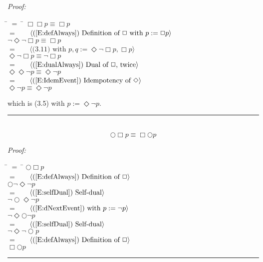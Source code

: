 \documentclass[fleqn, leqno]{article}
\newcommand{\lgap}{2pt}                             %
\newcommand{\mymathindent}{24pt}                      %
\newcommand{\next}{\bigcirc}
\newcommand{\event}{\Diamond}
\newcommand{\always}{\Box}
\newcommand{\myqed}{\hfill\rule[-.23ex]{1.2ex}{2.0ex}}
\newcommand{\Gll} {\langle}                         %
\newcommand{\Ggg} {\rangle}                         %
\newcommand{\Hint}[1]     {\ \ \ $\Gll              \mbox{#1} \Ggg$ }   %
\begin{document}
\emph{Proof:}
\begin{tabbing}
\hspace{\mymathindent} \= $= \;$ \= \kill
  \> \>   $\always\always p \equiv \always p$\\[\lgap]
  \> $=$  \>  \Hint{(\ref{E:defAlways}) Definition of $\always$ with $p := \always p$}\\[\lgap]
  \> \>   $\lnot\event\lnot\always p \equiv \always p$\\[\lgap]
  \> $=$  \>  \Hint{(3.11) with $p,q := \event\lnot\always p, \always p$}\\[\lgap]
  \> \>   $\event\lnot\always p \equiv \lnot\always p$\\[\lgap]
  \> $=$  \>  \Hint{(\ref{E:dualAlways}) Dual of $\always$, twice}\\[\lgap]
  \> \>   $\event\event\lnot p \equiv \event\lnot p$\\[\lgap]
  \> $=$  \>  \Hint{(\ref{E:IdemEvent}) Idempotency of $\event$}\\[\lgap]
  \> \>   $\event\lnot p \equiv \event\lnot p$\\[\lgap]
\end{tabbing}
which is (3.5) with $p := \event\lnot p$. \myqed\\[\lgap]


\begin{equation}\label{E:dNextAlways}
\next\always p \equiv \always\next p
\end{equation}

\emph{Proof:}
\begin{tabbing}
\hspace{\mymathindent} \= $= \;$ \= \kill
  \> \>   $\next\always p$\\[\lgap]
  \> $=$  \>  \Hint{(\ref{E:defAlways}) Definition of $\always$}\\[\lgap]
  \> \>   $\next\lnot\event\lnot p$\\[\lgap]
  \> $=$  \>  \Hint{(\ref{E:selfDual}) Self-dual}\\[\lgap]
  \> \>   $\lnot\next\event\lnot p$\\[\lgap]
  \> $=$  \>  \Hint{(\ref{E:dNextEvent}) with $p := \lnot p$}\\[\lgap]
  \> \>   $\lnot\event\next\lnot p$\\[\lgap]
  \> $=$  \>  \Hint{(\ref{E:selfDual}) Self-dual}\\[\lgap]
  \> \>   $\lnot\event\lnot\next p$\\[\lgap]
  \> $=$  \>  \Hint{(\ref{E:defAlways}) Definition of $\always$}\\[\lgap]
  \> \>   $\always\next p$\\[\lgap]
\end{tabbing}
\myqed\\[\lgap]
\end{document}
